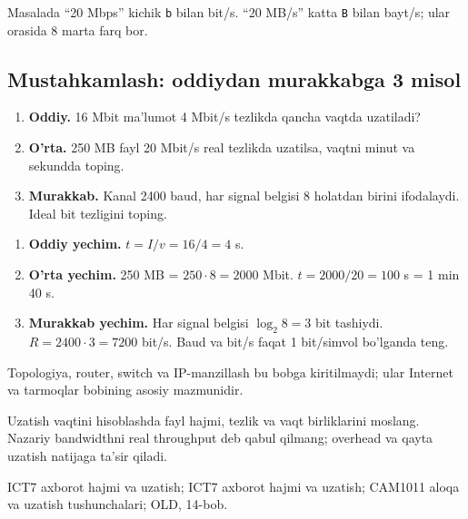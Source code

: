 \documentclass[11pt,a4paper,oneside]{book}
\begin{document}
\begin{attest}
Masalada ``20 Mbps'' kichik \texttt{b} bilan bit/s. ``20 MB/s'' katta \texttt{B} bilan bayt/s; ular orasida 8 marta farq bor.
\end{attest}

\subsection{Mustahkamlash: oddiydan murakkabga 3 misol}
\begin{taskbox}
\begin{enumerate}[leftmargin=7mm]
\item \textbf{Oddiy.} 16 Mbit ma'lumot 4 Mbit/s tezlikda qancha vaqtda uzatiladi?
\item \textbf{O'rta.} 250 MB fayl 20 Mbit/s real tezlikda uzatilsa, vaqtni minut va sekundda toping.
\item \textbf{Murakkab.} Kanal 2400 baud, har signal belgisi 8 holatdan birini ifodalaydi. Ideal bit tezligini toping.
\end{enumerate}
\end{taskbox}

\begin{solutionbox}
\begin{enumerate}[leftmargin=7mm]
\item \textbf{Oddiy yechim.} $t=I/v=16/4=4$ s.
\item \textbf{O'rta yechim.} 250 MB = $250\cdot8=2000$ Mbit. $t=2000/20=100$ s = 1 min 40 s.
\item \textbf{Murakkab yechim.} Har signal belgisi $\log_2 8=3$ bit tashiydi. $R=2400\cdot3=7200$ bit/s. Baud va bit/s faqat 1 bit/simvol bo'lganda teng.
\end{enumerate}
\end{solutionbox}
\begin{attest}Topologiya, router, switch va IP-manzillash bu bobga kiritilmaydi; ular Internet va tarmoqlar bobining asosiy mazmunidir.\end{attest}

\begin{summarybox}
Uzatish vaqtini hisoblashda fayl hajmi, tezlik va vaqt birliklarini moslang. Nazariy bandwidthni real throughput deb qabul qilmang; overhead va qayta uzatish natijaga ta'sir qiladi.
\end{summarybox}
\begin{sourcebox}
ICT7 axborot hajmi va uzatish; ICT7 axborot hajmi va uzatish; CAM1011 aloqa va uzatish tushunchalari; OLD, 14-bob.
\end{sourcebox}
\end{document}
